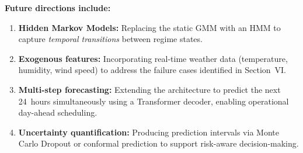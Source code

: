 \documentclass[conference, 10pt]{IEEEtran}
\begin{document}
\textbf{Future directions include:}
\begin{enumerate}
    \item \textbf{Hidden Markov Models:} Replacing the static GMM with an HMM to capture \emph{temporal transitions} between regime states.
    \item \textbf{Exogenous features:} Incorporating real-time weather data (temperature, humidity, wind speed) to address the failure cases identified in Section~VI.
    \item \textbf{Multi-step forecasting:} Extending the architecture to predict the next 24~hours simultaneously using a Transformer decoder, enabling operational day-ahead scheduling.
    \item \textbf{Uncertainty quantification:} Producing prediction intervals via Monte Carlo Dropout or conformal prediction to support risk-aware decision-making.
\end{enumerate}
\end{document}
